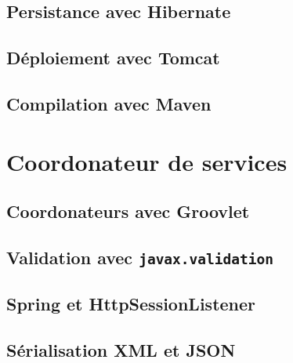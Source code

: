 \documentclass{article}
\begin{document}
\subsection{Persistance avec Hibernate} %
\label{sub:persistance_avec_hibernate}

\subsection{Déploiement avec Tomcat} %
\label{sub:deploiement_avec_tomcat}

\subsection{Compilation avec Maven} %
\label{sub:service_metier_compilation_avec_maven}


\section{Coordonateur de services} %
\label{sec:coordonateur_de_services}

\subsection{Coordonateurs avec Groovlet} %
\label{sub:coordonateurs_avec_groovlet}

\subsection{Validation avec \texttt{javax.validation}} %
\label{sub:validation_avec_javax.validation}

\subsection{Spring et HttpSessionListener} %
\label{sub:spring_et_httpsessionlistener}

\subsection{Sérialisation XML et JSON} %
\label{sub:serialisation_xml_et_json}
\end{document}
